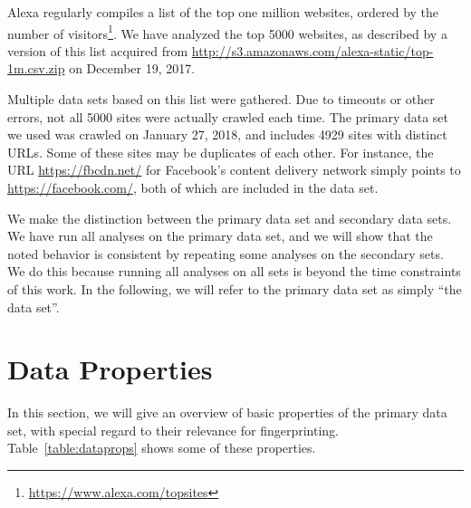 \documentclass[
    fontsize=12pt,
    headings=small,
    parskip=half,
    bibliography=totoc,
    numbers=noenddot,
    open=any
    ]{scrreprt}
\begin{document}
Alexa regularly compiles a list of the top one million websites, ordered by the number of
visitors\footnote{\url{https://www.alexa.com/topsites}}.
We have analyzed the top 5000 websites, as described by a version of this list acquired from
\url{http://s3.amazonaws.com/alexa-static/top-1m.csv.zip} on December 19, 2017.

Multiple data sets based on this list were gathered. Due to timeouts or other
errors, not all 5000 sites were actually crawled each time.
The primary data set we used was crawled on January 27, 2018, and includes 4929 sites with distinct URLs. Some of these sites
may be duplicates of each other. For instance, the URL \url{https://fbcdn.net/} for Facebook's content delivery
network simply points to \url{https://facebook.com/}, both of which are included in the data set.

We make the distinction between the primary data set and secondary data sets.
We have run all analyses on the primary data set, and we will show
that the noted behavior is consistent by repeating some analyses
on the secondary sets.
We do this because running all analyses on all sets is beyond the time
constraints of this work.
In the following, we will refer to the primary data set as simply ``the data set''.

\section{Data Properties}
In this section, we will give an overview of basic properties of the primary data set,
with special regard to their relevance for fingerprinting.
Table~\ref{table:dataprops} shows some of these properties.
\end{document}
